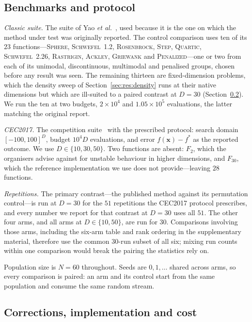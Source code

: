 \subsection{Benchmarks and protocol}
\label{sec:benchmarks}

\emph{Classic suite.} The suite of Yao \emph{et
al.}~\cite{yao1999evolutionary}, used because it is the one on which the method
under test was originally reported. The control comparison uses ten of its $23$
functions---\textsc{Sphere}, \textsc{Schwefel}~1.2, \textsc{Rosenbrock},
\textsc{Step}, \textsc{Quartic}, \textsc{Schwefel}~2.26, \textsc{Rastrigin},
\textsc{Ackley}, \textsc{Griewank} and \textsc{Penalized}---one or two from
each of its unimodal, discontinuous, multimodal and penalised groups, chosen
before any result was seen. The remaining thirteen are fixed-dimension
problems, which the density sweep of Section~\ref{sec:res:density} runs at
their native dimensions but which are ill-suited to a paired contrast at
$D=30$ (Section~\ref{sec:corrections}). We run the ten at two budgets,
$2\times10^{4}$ and $1.05\times10^{5}$ evaluations, the latter matching the
original report.

\emph{CEC2017.} The competition suite~\cite{awad2016cec2017} with the
prescribed protocol: search domain $[-100,100]^{D}$, budget $10^{4}D$
evaluations, and error $f(\mathbf{x})-f^{*}$ as the reported outcome. We use
$D\in\{10,30,50\}$. Two functions are absent: $F_{2}$, which the organisers
advise against for unstable behaviour in higher dimensions, and $F_{30}$,
which the reference implementation we use does not provide---leaving $28$
functions.

\emph{Repetitions.} The primary contrast---the published method against its
permutation control---is run at $D=30$ for the $51$ repetitions the CEC2017
protocol prescribes, and every number we report for that contrast at $D=30$
uses all $51$. The other four arms, and all arms at $D\in\{10,50\}$, are run
for $30$. Comparisons involving those arms, including the six-arm table and
rank ordering in the supplementary material, therefore use the common $30$-run
subset of all six; mixing run counts within one comparison would break the
pairing the statistics rely on.

Population size is $N=60$ throughout. Seeds are $0,1,\dots$ shared across
arms, so every comparison is paired: an arm and its control start from the
same population and consume the same random stream.

\subsection{Corrections, implementation and cost}
\label{sec:corrections}

